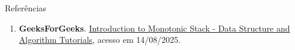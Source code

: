 \begin{frame}[fragile]{Referências}

    \begin{enumerate}
        \item \textbf{GeeksForGeeks}. \href{https://www.geeksforgeeks.org/dsa/introduction-to-monotonic-stack-2/}{Introduction to Monotonic Stack - Data Structure and Algorithm Tutorials}, acesso em 14/08/2025.
    \end{enumerate}

\end{frame}
